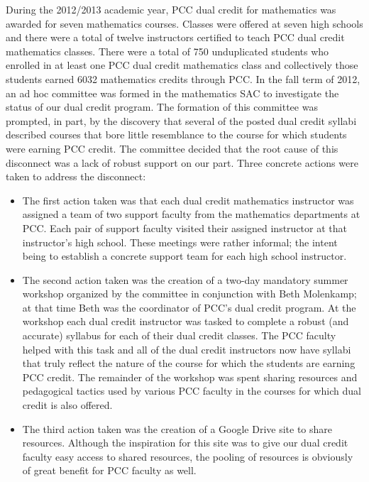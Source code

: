 During the 2012/2013 academic year, PCC dual credit for mathematics was awarded for seven mathematics courses.  Classes were offered at seven high schools and there were a total of twelve instructors certified to teach PCC dual credit mathematics classes.  There were a total of 750 unduplicated students who enrolled in at least one PCC dual credit mathematics class and collectively those students earned 6032 mathematics credits through PCC.
In the fall term of 2012, an ad hoc committee was formed in the mathematics SAC to investigate the status of our dual credit program.  The formation of this committee was prompted, in part, by the discovery that several of the posted dual credit syllabi described courses that bore little resemblance to the course for which students were earning PCC credit.  The committee decided that the root cause of this disconnect was a lack of robust support on our part.  Three concrete actions were taken to address the disconnect:
\begin{itemize}
\item The first action taken was that each dual credit mathematics instructor was assigned a team of two support faculty from the mathematics departments at PCC.  Each pair of support faculty visited their assigned instructor at that instructor's high school.  These meetings were rather informal; the intent being to establish a concrete support team for each high school instructor.
\item The second action taken was the creation of a two-day mandatory summer workshop organized by the committee in conjunction with Beth Molenkamp; at that time Beth was the coordinator of PCC's dual credit program.  At the workshop each dual credit instructor was tasked to complete a robust (and accurate) syllabus for each of their dual credit classes.  The PCC faculty helped with this task and all of the dual credit instructors now have syllabi that truly reflect the nature of the course for which the students are earning PCC credit.  The remainder of the workshop was spent sharing resources and pedagogical tactics used by various PCC faculty in the courses for which dual credit is also offered.
\item The third action taken was the creation of a Google Drive site to share resources.  Although the inspiration for this site was to give our dual credit faculty easy access to shared resources, the pooling of resources is obviously of great benefit for PCC faculty as well.
\end{itemize}

